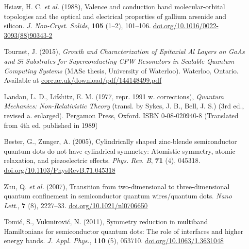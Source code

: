 \documentclass[12pt]{article}
\numberwithin{equation}{section}
\begin{document}
\begin{thebibliography}{10}
Hsiaw, H. C. \textit{et al.} (1988), Valence and conduction band molecular-orbital topologies and the optical and electrical properties of gallium arsenide and silicon. \textit{J. Non-Cryst. Solids}, \textbf{105} (1--2), 101--106. \href{https://doi.org/10.1016/0022-3093(88)90343-2}{doi.org/10.1016/0022-3093(88)90343-2}

Tournet, J. (2015), \textit{Growth and Characterization of Epitaxial Al Layers on GaAs and Si Substrates for Superconducting CPW Resonators in Scalable Quantum Computing Systems} (MASc thesis, University of Waterloo). Waterloo, Ontario. Available at \href{https://core.ac.uk/download/pdf/144148499.pdf}{core.ac.uk/download/pdf/144148499.pdf}

Landau, L. D., Lifshitz, E. M. (1977, repr. 1991 w. corrections), \textit{Quantum Mechanics: Non-Relativistic Theory} (transl. by Sykes, J. B., Bell, J. S.) (3rd ed., revised a. enlarged). Pergamon Press, Oxford. ISBN 0-08-020940-8 (Translated from 4th ed. published in 1989)

Bester, G., Zunger, A. (2005), Cylindrically shaped zinc-blende semiconductor quantum dots do not have cylindrical symmetry: Atomistic symmetry, atomic relaxation, and piezoelectric effects. \textit{Phys. Rev. B}, \textbf{71} (4), 045318. \href{https://doi.org/10.1103/PhysRevB.71.045318}{doi.org/10.1103/PhysRevB.71.045318}

Zhu, Q. \textit{et al.} (2007), Transition from two-dimensional to three-dimensional quantum confinement in semiconductor quantum wires/quantum dots. \textit{Nano Lett.}, \textbf{7} (8), 2227--33. \href{https://doi.org/10.1021/nl0706650}{doi.org/10.1021/nl0706650}

Tomić, S., Vukmirović, N. (2011), Symmetry reduction in multiband Hamiltonians for semiconductor quantum dots: The role of interfaces and higher energy bands. \textit{J. Appl. Phys.}, \textbf{110} (5), 053710. \href{https://doi.org/10.1063/1.3631048}{doi.org/10.1063/1.3631048}


\end{thebibliography}



%

\endgroup





\end{document}
